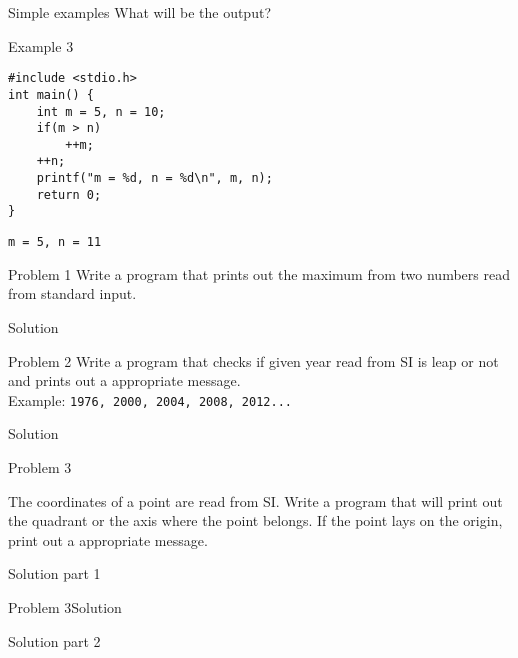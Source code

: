 \begin{frame}[fragile]{Simple examples}
What will be the output?
\begin{exampleblock}{Example 3}
	\begin{lstlisting}
#include <stdio.h>
int main() {
    int m = 5, n = 10;
    if(m > n)
        ++m;
    ++n;
    printf("m = %d, n = %d\n", m, n);
    return 0;
} 
\end{lstlisting}
\end{exampleblock}
\pause
\vfill
\texttt{m = 5, n = 11}
\end{frame}


\begin{frame}[fragile]{Problem 1}
Write a program that prints out the maximum from two numbers read from
standard input.
\pause 
	\begin{exampleblock}{Solution}
	
	\end{exampleblock}

\end{frame}

\begin{frame}[fragile]{Problem 2}
Write a program that checks if given year read from SI is leap or not and prints
out a appropriate message.\\
Example: \texttt{1976, 2000, 2004, 2008, 2012...}
\pause
	\begin{exampleblock}{Solution}
	
	\end{exampleblock}
\end{frame}


\begin{frame}[fragile]{Problem 3}
\begin{scriptsize}
The coordinates of a point are read from SI. Write a program that will print out
the quadrant or the axis where the point belongs. If the point lays on the
origin, print out a appropriate message.
\end{scriptsize}
\pause
	\begin{exampleblock}{Solution part 1}
	
	\end{exampleblock}
\end{frame}



\begin{frame}[fragile]{Problem 3}{Solution}
	\begin{exampleblock}{Solution part 2}
	
	\end{exampleblock}
\end{frame}



